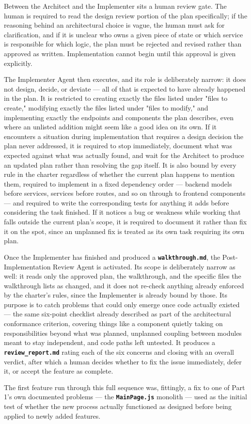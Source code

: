 Between the Architect and the Implementer sits a human review gate. The human is required to read the design review portion of the plan specifically; if the reasoning behind an architectural choice is vague, the human must ask for clarification, and if it is unclear who owns a given piece of state or which service is responsible for which logic, the plan must be rejected and revised rather than approved as written. Implementation cannot begin until this approval is given explicitly.

The Implementer Agent then executes, and its role is deliberately narrow: it does not design, decide, or deviate --- all of that is expected to have already happened in the plan. It is restricted to creating exactly the files listed under "files to create," modifying exactly the files listed under "files to modify," and implementing exactly the endpoints and components the plan describes, even where an unlisted addition might seem like a good idea on its own. If it encounters a situation during implementation that requires a design decision the plan never addressed, it is required to stop immediately, document what was expected against what was actually found, and wait for the Architect to produce an updated plan rather than resolving the gap itself. It is also bound by every rule in the charter regardless of whether the current plan happens to mention them, required to implement in a fixed dependency order --- backend models before services, services before routes, and so on through to frontend components --- and required to write the corresponding tests for anything it adds before considering the task finished. If it notices a bug or weakness while working that falls outside the current plan's scope, it is required to document it rather than fix it on the spot, since an unplanned fix is treated as its own task requiring its own plan.

Once the Implementer has finished and produced a \textbf{\texttt{walkthrough.md}}, the Post-Implementation Review Agent is activated. Its scope is deliberately narrow as well: it reads only the approved plan, the walkthrough, and the specific files the walkthrough lists as changed, and it does not re-check anything already enforced by the charter's rules, since the Implementer is already bound by those. Its purpose is to catch problems that could only emerge once code actually existed --- the same six-point checklist already described as part of the architectural conformance criterion, covering things like a component quietly taking on responsibilities beyond what was planned, unplanned coupling between modules meant to stay independent, and code paths left untested. It produces a \textbf{\texttt{review\_report.md}} rating each of the six concerns and closing with an overall verdict, after which a human decides whether to fix the issue immediately, defer it, or accept the feature as complete.

The first feature run through this full sequence was, fittingly, a fix to one of Part 1's own documented problems --- the \textbf{\texttt{MainPage.js}} monolith --- used as the initial test of whether the new process actually functioned as designed before being applied to newly added features.

